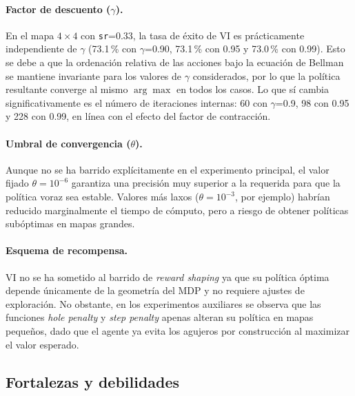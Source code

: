 \documentclass[11pt,a4paper]{article}
\begin{document}
\paragraph{Factor de descuento ($\gamma$).} En el mapa $4\times 4$ con \texttt{sr}=0.33, la tasa de éxito de VI es prácticamente independiente de $\gamma$ (73.1\,\% con $\gamma$=0.90, 73.1\,\% con 0.95 y 73.0\,\% con 0.99). Esto se debe a que la ordenación relativa de las acciones bajo la ecuación de Bellman se mantiene invariante para los valores de $\gamma$ considerados, por lo que la política resultante converge al mismo $\arg\max$ en todos los casos. Lo que sí cambia significativamente es el número de iteraciones internas: 60 con $\gamma$=0.9, 98 con 0.95 y 228 con 0.99, en línea con el efecto del factor de contracción.

\paragraph{Umbral de convergencia ($\theta$).} Aunque no se ha barrido explícitamente en el experimento principal, el valor fijado $\theta=10^{-6}$ garantiza una precisión muy superior a la requerida para que la política voraz sea estable. Valores más laxos ($\theta=10^{-3}$, por ejemplo) habrían reducido marginalmente el tiempo de cómputo, pero a riesgo de obtener políticas subóptimas en mapas grandes.

\paragraph{Esquema de recompensa.} VI no se ha sometido al barrido de \emph{reward shaping} ya que su política óptima depende únicamente de la geometría del MDP y no requiere ajustes de exploración. No obstante, en los experimentos auxiliares se observa que las funciones \emph{hole penalty} y \emph{step penalty} apenas alteran su política en mapas pequeños, dado que el agente ya evita los agujeros por construcción al maximizar el valor esperado.

\subsection{Fortalezas y debilidades}
\end{document}
